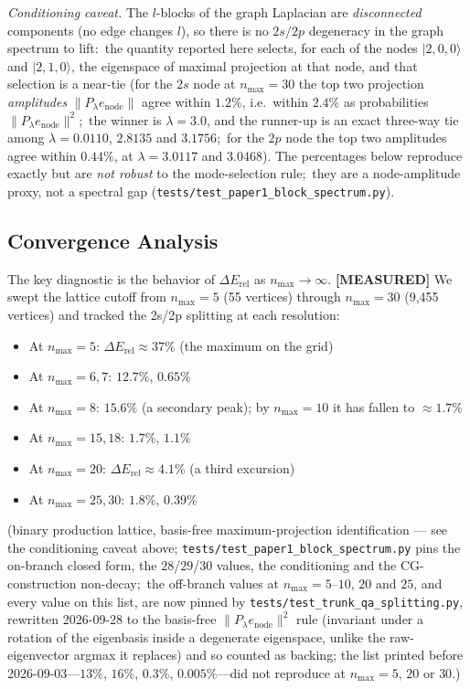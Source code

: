 \documentclass[aps,pra,twocolumn,superscriptaddress,longbibliography]{revtex4-2}
\begin{document}
\emph{Conditioning caveat.}  The $l$-blocks of the graph Laplacian are \emph{disconnected} components (no edge changes $l$), so there is no $2s/2p$ degeneracy in the graph spectrum to lift:\ the quantity reported here selects, for each of the nodes $|2,0,0\rangle$ and $|2,1,0\rangle$, the eigenspace of maximal projection at that node, and that selection is a near-tie (for the $2s$ node at $n_{\max} = 30$ the top two projection \emph{amplitudes} $\|P_\lambda e_{\mathrm{node}}\|$ agree within $1.2\%$, i.e.\ within $2.4\%$ as probabilities $\|P_\lambda e_{\mathrm{node}}\|^2$;\ the winner is $\lambda = 3.0$, and the runner-up is an exact three-way tie among $\lambda = 0.0110$, $2.8135$ and $3.1756$;\ for the $2p$ node the top two amplitudes agree within $0.44\%$, at $\lambda = 3.0117$ and $3.0468$).  The percentages below reproduce exactly but are \emph{not robust} to the mode-selection rule;\ they are a node-amplitude proxy, not a spectral gap (\texttt{tests/test\_paper1\_block\_spectrum.py}).

\subsection{Convergence Analysis}

The key diagnostic is the behavior of $\Delta E_{\mathrm{rel}}$ as
$n_{\max} \to \infty$. \textbf{[MEASURED]} We swept the lattice cutoff from $n_{\max} = 5$
(55 vertices) through $n_{\max} = 30$ (9{,}455 vertices) and tracked
the 2s/2p splitting at each resolution:

\begin{itemize}
  \item At $n_{\max} = 5$: $\Delta E_{\mathrm{rel}} \approx 37\%$ (the
    maximum on the grid)
  \item At $n_{\max} = 6, 7$: $12.7\%$, $0.65\%$
  \item At $n_{\max} = 8$: $15.6\%$ (a secondary peak); by
    $n_{\max} = 10$ it has fallen to $\approx 1.7\%$
  \item At $n_{\max} = 15, 18$: $1.7\%$, $1.1\%$
  \item At $n_{\max} = 20$: $\Delta E_{\mathrm{rel}} \approx 4.1\%$ (a
    third excursion)
  \item At $n_{\max} = 25, 30$: $1.8\%$, $0.39\%$
\end{itemize}
(binary production lattice, basis-free maximum-projection identification ---
see the conditioning caveat above;
\texttt{tests/test\_paper1\_block\_spectrum.py} pins the on-branch closed
form, the $28$/$29$/$30$ values, the conditioning and the
CG-construction non-decay;\ the off-branch values at $n_{\max} = 5$--$10$,
$20$ and $25$, and every value on this list, are now pinned by
\texttt{tests/test\_trunk\_qa\_splitting.py}, rewritten 2026-09-28 to the
basis-free $\|P_\lambda e_{\mathrm{node}}\|^2$ rule (invariant under a
rotation of the eigenbasis inside a degenerate eigenspace, unlike the
raw-eigenvector argmax it replaces) and so counted as backing; the list
printed before 2026-09-03---$13\%$, $16\%$, $0.3\%$, $0.005\%$---did not
reproduce at $n_{\max} = 5$, $20$ or $30$.)
\end{document}
